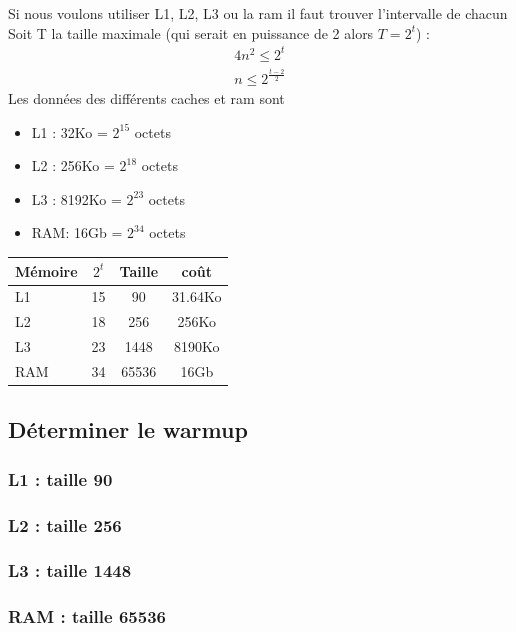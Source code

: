 \documentclass{report}
\begin{document}
    Si nous voulons utiliser L1, L2, L3 ou la ram il faut trouver l'intervalle de chacun
    Soit T la taille maximale (qui serait en puissance de 2 alors $T=2^t$) :
    \begin{align}
      4n^2 \leq 2^t \\
      n \leq 2^{\frac{t-2}{2}}
    \end{align}
    Les données des différents caches et ram sont
    \begin{itemize}
      \item L1 : 32Ko   = $2^{15}$ octets
      \item L2 : 256Ko  = $2^{18}$ octets
      \item L3 : 8192Ko = $2^{23}$ octets
      \item RAM: 16Gb   = $2^{34}$ octets
    \end{itemize}
    \vspace{5mm}
    \begin{tabular}{|l| c | c | c|}
      \hline
      Mémoire & $2^t$ & Taille & coût \\\hline
      \hline
      L1 & 15 & 90 & 31.64Ko \\\hline
      L2 & 18 & 256 & 256Ko \\\hline
      L3 & 23 & 1448 & 8190Ko \\\hline
      RAM & 34 & 65536 & 16Gb \\\hline
    \end{tabular}
    \subsection{Déterminer le warmup}
    \subsubsection{L1 : taille 90}
    \subsubsection{L2 : taille 256}
    \subsubsection{L3 : taille 1448}
    \subsubsection{RAM : taille 65536}
\end{document}

